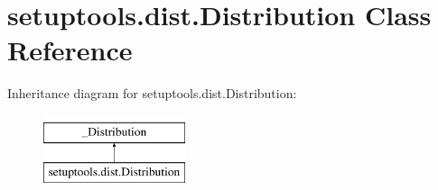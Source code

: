 \hypertarget{classsetuptools_1_1dist_1_1Distribution}{}\section{setuptools.\+dist.\+Distribution Class Reference}
\label{classsetuptools_1_1dist_1_1Distribution}
Inheritance diagram for setuptools.\+dist.\+Distribution\+:\begin{figure}[H]
\begin{center}
\leavevmode
\includegraphics[height=2.000000cm]{classsetuptools_1_1dist_1_1Distribution}
\end{center}
\end{figure}
